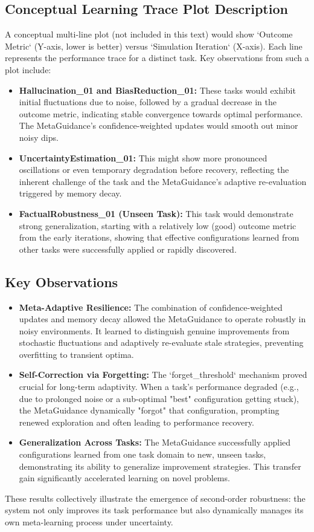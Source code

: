 \documentclass{article}
\begin{document}
\subsection{Conceptual Learning Trace Plot Description}
A conceptual multi-line plot (not included in this text) would show `Outcome Metric` (Y-axis, lower is better) versus `Simulation Iteration` (X-axis). Each line represents the performance trace for a distinct task. Key observations from such a plot include:
\begin{itemize}
    \item \textbf{Hallucination\_01 and BiasReduction\_01:} These tasks would exhibit initial fluctuations due to noise, followed by a gradual decrease in the outcome metric, indicating stable convergence towards optimal performance. The MetaGuidance's confidence-weighted updates would smooth out minor noisy dips.
    \item \textbf{UncertaintyEstimation\_01:} This might show more pronounced oscillations or even temporary degradation before recovery, reflecting the inherent challenge of the task and the MetaGuidance's adaptive re-evaluation triggered by memory decay.
    \item \textbf{FactualRobustness\_01 (Unseen Task):} This task would demonstrate strong generalization, starting with a relatively low (good) outcome metric from the early iterations, showing that effective configurations learned from other tasks were successfully applied or rapidly discovered.
\end{itemize}

\subsection{Key Observations}
\begin{itemize}
    \item \textbf{Meta-Adaptive Resilience:} The combination of confidence-weighted updates and memory decay allowed the MetaGuidance to operate robustly in noisy environments. It learned to distinguish genuine improvements from stochastic fluctuations and adaptively re-evaluate stale strategies, preventing overfitting to transient optima.
    \item \textbf{Self-Correction via Forgetting:} The `forget_threshold` mechanism proved crucial for long-term adaptivity. When a task's performance degraded (e.g., due to prolonged noise or a sub-optimal "best" configuration getting stuck), the MetaGuidance dynamically "forgot" that configuration, prompting renewed exploration and often leading to performance recovery.
    \item \textbf{Generalization Across Tasks:} The MetaGuidance successfully applied configurations learned from one task domain to new, unseen tasks, demonstrating its ability to generalize improvement strategies. This transfer gain significantly accelerated learning on novel problems.
\end{itemize}
These results collectively illustrate the emergence of second-order robustness: the system not only improves its task performance but also dynamically manages its own meta-learning process under uncertainty.
\end{document}
